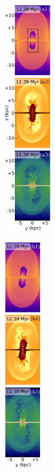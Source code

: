 \documentclass[fleqn,usenatbib,useAMS]{mnras}
\begin{document}
 \begin{figure}%
      \captionsetup[subfigure]{labelformat=simple}
      \begin{subfigure}[b]{0.2\linewidth}%
         \includegraphics[height=10cm]{figures/fig__jetI5+ismSeed3-45deg-a}%
         \caption{}%
         \label{fig__jetI5+ismSeed3-45deg-a}%
      \end{subfigure}%
      \hspace{10pt}%
      \begin{subfigure}[b]{0.2\linewidth}%
         \includegraphics[height=10cm]{figures/fig__jetI5+ismSeed3-45deg-b}%
         \caption{}%
         \label{fig__jetI5+ismSeed3-45deg-b}%
      \end{subfigure}%

\end{figure}
\end{document}

